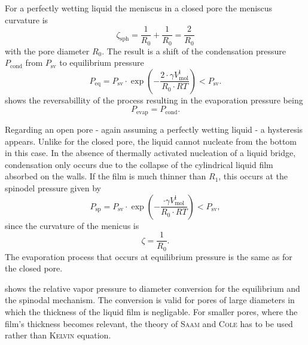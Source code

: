 \documentclass[../thesis.tex]{subfiles}
\begin{document}
      For a perfectly wetting liquid the meniscus in a closed pore the meniscus curvature is
      \begin{equation*}
        \zeta_\mathrm{sph} = \frac{1}{R_0}+\frac{1}{R_0}=\frac{2}{R_0}
      \end{equation*}
      with the pore diameter $R_0$. The result is a shift of the condensation pressure $P_\mathrm{cond}$ from $P_\mathrm{sv}$ to equilibrium pressure
      \begin{equation}
        P_\mathrm{eq}=P_\mathrm{sv}\cdot\exp{\left(-\frac{2\cdot \gamma V_\mathrm{mol}^\mathrm{l}}{R_0\cdot RT}\right)}<P_\mathrm{sv}.
        \label{eq:p-eq}
      \end{equation}
       shows the reversabillity of the process resulting in the evaporation pressure being
      \begin{equation*}
        P_\mathrm{evap}=P_\mathrm{cond}.
      \end{equation*}
      \medskip

      

      Regarding an open pore - again assuming a perfectly wetting liquid - a hysteresis appears. Unlike for the closed pore, the liquid cannot nucleate from the bottom in this case. In the absence of thermally activated nucleation of a liquid bridge, condensation only occurs due to the collapse of the cylindrical liquid film absorbed on the walls. If the film is much thinner than $R_1$, this occurs at the spinodel pressure given by
      \begin{equation}
        P_\mathrm{sp}=P_\mathrm{sv}\cdot\exp{\left(-\frac{\cdot \gamma V_\mathrm{mol}^\mathrm{l}}{R_0\cdot RT}\right)}<P_\mathrm{sv},
        \label{eq:p-sp}
      \end{equation}
      since the curvature of the menicus is
      \begin{equation*}
        \zeta = \frac{1}{R_0}.
      \end{equation*}
      The evaporation process that occurs at equilibrium pressure is the same as for the closed pore.

       shows the relative vapor pressure to diameter conversion for the equilibrium and the spinodal mechanism. The conversion is valid for pores of large diameters in which the thickness of the liquid film is negligable. For smaller pores, where the film's thickness becomes relevant, the theory of \textsc{Saam} and \textsc{Cole} has to be used rather than \textsc{Kelvin} equation.
\end{document}
